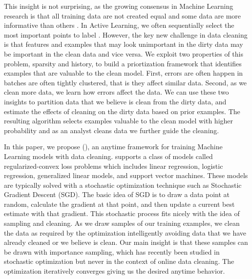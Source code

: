 This insight is not surprising, as the growing consensus in Machine Learning research is that all training data are not created equal and some data are more informative than others \cite{drineas2012fast, settles2010active}.
In Active Learning, we often sequentially select the most important points to label \cite{settles2010active}.
However, the key new challenge in data cleaning is that features and examples that may look unimportant in the dirty data may be important in the clean data and vice versa.
We exploit two properties of this problem, sparsity and history, to build a priortization framework that identifies examples that are valuable to the clean model.
First, errors are often happen in batches are often tightly clustered, that is they affect similar data.
Second, as we clean more data, we learn how errors affect the data.
We can use these two insights to partition data that we believe is clean from the dirty data, and estimate the effects of cleaning on the dirty data based on prior examples.
The resulting algorithm selects examples valuable to the clean model with higher probability and as an analyst cleans data we further guide the cleaning.

In this paper, we propose \sysfull (\sys), an anytime framework for training Machine Learning models with data cleaning.
\sys supports a class of models called regularized-convex loss problems which includes linear regression, logistic regression, generalized linear models, and support vector machines.
These models are typically solved with a stochastic optimization technique such as Stochastic Gradient Descent (SGD).
The basic idea of SGD is to draw a data point at random, calculate the gradient at that point, and then update a current best estimate with that gradient.
This stochastic process fits nicely with the idea of sampling and cleaning.
As we draw samples of our training examples, we clean the data as required by the optimization intelligently avoiding data that we have already cleaned or we believe is clean.
Our main insight is that these samples can be drawn with importance sampling, which has recently been studied in stochastic optimization \cite{zhao2014stochastic} but never in the context of online data cleaning. 
The optimization iteratively converges giving us the desired anytime behavior.

